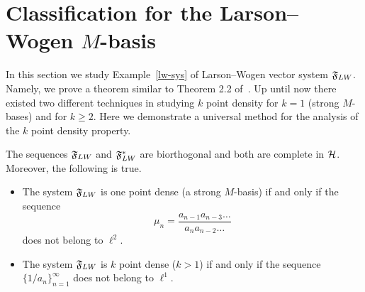 \section{Classification for the Larson--Wogen $M$-basis}
  \label{section:lw-sys}
  In this section we study Example~\ref{lw-sys} of Larson--Wogen vector system $\fsys_{LW}$.
  Namely, we prove a theorem similar to Theorem 2.2 of~\cite{katavolos}.
  Up until now there existed two different techniques in studying $k$ point density for $k=1$ (strong $M$-bases) and for $k\geq2$.
  Here we demonstrate a universal method for the analysis of the $k$ point density property.
  \begin{theorem}
    \label{thm:katavolos}
    The sequences $\fsys_{LW}$ and $\fsys_{LW}^*$ are biorthogonal and both are complete in $\cal{H}$.
    Moreover, the following is true.
    \begin{itemize}
      \item  The system $\fsys_{LW}$ is one point dense (a strong $M$-basis) if and only if the sequence
        \begin{equation}
          \mu_n = \frac{a_{n-1} a_{n-3} \dots}{a_{n} a_{n-2} \dots }
        \end{equation}
        does not belong to $\ell^2$.
      \item The system $\fsys_{LW}$ is $k$ point dense ($k > 1$) if and only if the sequence $\{1/a_n\}_{n=1}^\infty$ does not belong to $\ell^1$.
    \end{itemize}
  \end{theorem}
